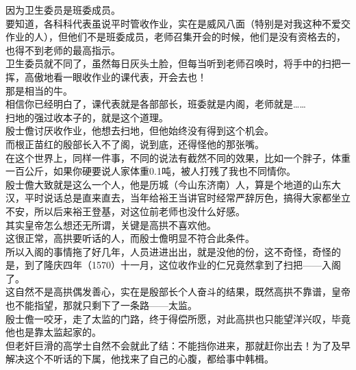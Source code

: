\begin{multicols}{\theparacolNo}
因为卫生委员是班委成员。\\

要知道，各科科代表虽说平时管收作业，实在是威风八面（特别是对我这种不爱交作业的人），但他们不是班委成员，老师召集开会的时候，他们是没有资格去的，也得不到老师的最高指示。\\

卫生委员就不同了，虽然每日灰头土脸，但每当听到老师召唤时，将手中的扫把一挥，高傲地看一眼收作业的课代表，开会去也！\\

那是相当的牛。\\

相信你已经明白了，课代表就是各部部长，班委就是内阁，老师就是……\\

扫地的强过收本子的，就是这个道理。\\

殷士儋讨厌收作业，他想去扫地，但他始终没有得到这个机会。\\

而根正苗红的殷部长入不了阁，说到底，还得怪他的那张嘴。\\

在这个世界上，同样一件事，不同的说法有截然不同的效果，比如一个胖子，体重一百公斤，如果你硬要说人家体重0.1吨，被人打残了我也不同情你。\\

殷士儋大致就是这么一个人，他是历城（今山东济南）人，算是个地道的山东大汉，平时说话总是直来直去，当年给裕王当讲官时经常严辞厉色，搞得大家都坐立不安，所以后来裕王登基，对这位前老师也没什么好感。\\

其实皇帝怎么想还无所谓，关键是高拱不喜欢他。\\

这很正常，高拱要听话的人，而殷士儋明显不符合此条件。\\

所以入阁的事情拖了好几年，人员进进出出，就是没他的份，这不奇怪，奇怪的是，到了隆庆四年（1570）十一月，这位收作业的仁兄竟然拿到了扫把——入阁了。\\

这自然不是高拱偶发善心，实在是殷部长个人奋斗的结果，既然高拱不靠谱，皇帝也不能指望，那就只剩下了一条路——太监。\\

殷士儋一咬牙，走了太监的门路，终于得偿所愿，对此高拱也只能望洋兴叹，毕竟他也是靠太监起家的。\\

但老奸巨滑的高学士自然不会就此了结：不能挡你进来，那就赶你出去！为了及早解决这个不听话的下属，他找来了自己的心腹，都给事中韩楫。\\


\end{multicols}

